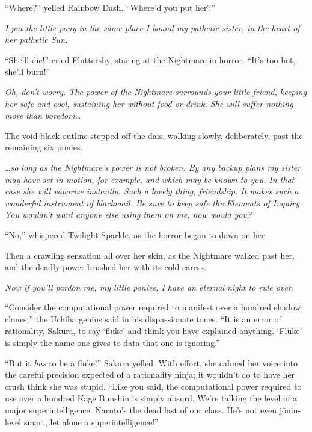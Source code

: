 “Where?” yelled Rainbow Dash. “Where’d you put her?”

\emph{I put the little pony in the same place I bound my pathetic sister, in the heart of her pathetic Sun.}

“She’ll die!” cried Fluttershy, staring at the Nightmare in horror. “It’s too hot, she’ll burn!”

\emph{Oh, don’t worry. The power of the Nightmare surrounds your little friend, keeping her safe and cool, sustaining her without food or drink. She will suffer nothing more than boredom…}

The void-black outline stepped off the dais, walking slowly, deliberately, past the remaining six ponies.

\emph{…so long as the Nightmare’s power is not broken. By any backup plans my sister may have set in motion, for example, and which may be known to you. In that case she will vaporize instantly. Such a lovely thing, friendship. It makes such a wonderful instrument of blackmail. Be sure to keep safe the Elements of Inquiry. You wouldn’t want anyone else using them on me, now would you?}

“No,” whispered Twilight Sparkle, as the horror began to dawn on her.

Then a crawling sensation all over her skin, as the Nightmare walked past her, and the deadly power brushed her with its cold caress.

\emph{Now if you’ll pardon me, my little ponies, I have an eternal night to rule over.}

\clearpage
{}

“Consider the computational power required to manifest over a hundred shadow clones,” the Uchiha genius said in his dispassionate tones. “It is an error of rationality, Sakura, to say ‘fluke’ and think you have explained anything. ‘Fluke’ is simply the name one gives to data that one is ignoring.”

“But it \emph{has} to be a fluke!” Sakura yelled. With effort, she calmed her voice into the careful precision expected of a rationality ninja; it wouldn’t do to have her crush think she was stupid. “Like you said, the computational power required to use over a hundred Kage Bunshin is simply absurd. We’re talking the level of a major superintelligence. Naruto’s the dead last of our class. He’s not even jōnin-level smart, let alone a superintelligence!”

